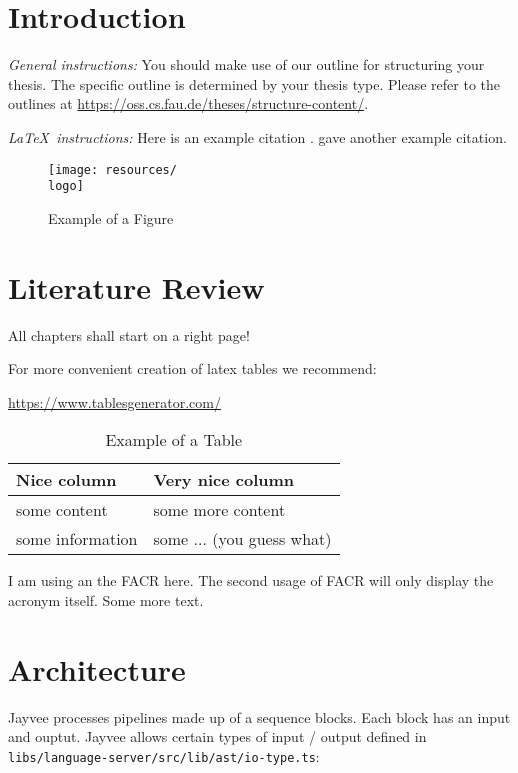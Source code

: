 
\chapter{Introduction}
\label{chapter:Introduction}

{\textsl{General instructions:}}
You should make use of our outline for structuring your
thesis. The specific outline is determined by your thesis type.
Please refer to the outlines at
\url{https://oss.cs.fau.de/theses/structure-content/}.

{\textsl{\LaTeX\ instructions:}} Here is an example citation
\autocite{riehle:2011:controlling}.
\textcite{riehle:2007:economic} gave another example citation.

\begin{figure}[ht]
	\texttt{[image: resources/\\logo]}
	\caption{Example of a Figure}
	\label{fig:example}
\end{figure}

\chapter{Literature Review}
\label{chapter:Literature}

All chapters shall start on a right page!

For more convenient creation of latex tables we recommend:

\url{https://www.tablesgenerator.com/}

\begin{table}[ht]
	\caption{Example of a Table}
	\label{tab:example}
	\begin{tabular}{|l|l|}
		\hline
		Nice column      & Very nice column          \\
		\hline
		some content     & some more content         \\
		some information & some ... (you guess what) \\
		\hline
	\end{tabular}
\end{table}

I am using an the \ac{FACR} here. The second usage of \ac{FACR} will only display the acronym itself.
\newpage
Some more text.

\chapter{Architecture}
\label{chapter:Architecture}

Jayvee processes pipelines made up of a sequence blocks.
Each block has an input and ouptut.
Jayvee allows certain types of input / output defined in \lstinline{libs/language-server/src/lib/ast/io-type.ts}:


